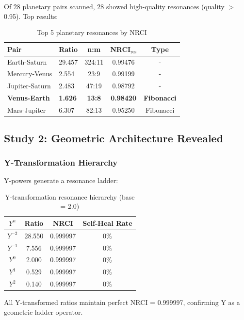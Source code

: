 \documentclass[12pt,a4paper]{article}
\begin{document}
Of 28 planetary pairs scanned, 28 showed high-quality resonances (quality $>$ 0.95). Top results:

\begin{table}[h]
\centering
\small
\begin{tabular}{llccc}
\hline
\textbf{Pair} & \textbf{Ratio} & \textbf{n:m} & \textbf{NRCI$_{\text{res}}$} & \textbf{Type} \\
\hline
Earth-Saturn & 29.457 & 324:11 & 0.99476 & - \\
Mercury-Venus & 2.554 & 23:9 & 0.99199 & - \\
Jupiter-Saturn & 2.483 & 47:19 & 0.98792 & - \\
\textbf{Venus-Earth} & \textbf{1.626} & \textbf{13:8} & \textbf{0.98420} & \textbf{Fibonacci} \\
Mars-Jupiter & 6.307 & 82:13 & 0.95250 & Fibonacci \\
\hline
\end{tabular}
\caption{Top 5 planetary resonances by NRCI}
\end{table}

\subsection{Study 2: Geometric Architecture Revealed}

\subsubsection{Y-Transformation Hierarchy}

Y-powers generate a resonance ladder:

\begin{table}[h]
\centering
\begin{tabular}{cccc}
\hline
\textbf{$Y^n$} & \textbf{Ratio} & \textbf{NRCI} & \textbf{Self-Heal Rate} \\
\hline
$Y^{-2}$ & 28.550 & 0.999997 & 0\% \\
$Y^{-1}$ & 7.556 & 0.999997 & 0\% \\
$Y^0$ & 2.000 & 0.999997 & 0\% \\
$Y^1$ & 0.529 & 0.999997 & 0\% \\
$Y^2$ & 0.140 & 0.999997 & 0\% \\
\hline
\end{tabular}
\caption{Y-transformation resonance hierarchy (base = 2.0)}
\end{table}

All Y-transformed ratios maintain perfect NRCI = 0.999997, confirming Y as a geometric ladder operator.
\end{document}
